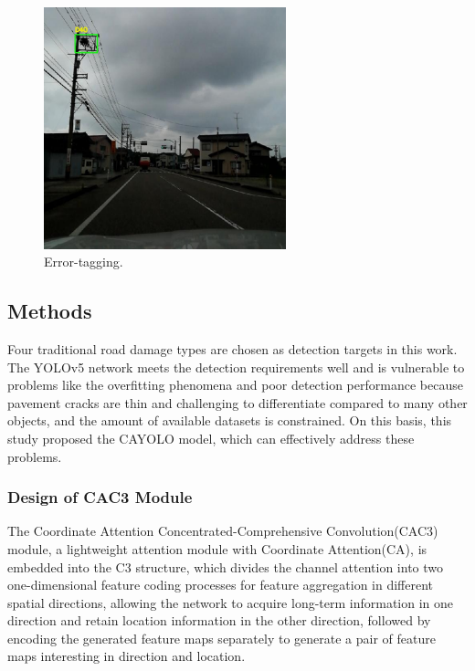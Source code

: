 \documentclass[sensors,article,submit,moreauthors]{Definitions/mdpi}
\begin{document}
    \begin{figure}[H]
        \includegraphics[width=7cm]{images/figure2}
        \caption{Error-tagging.\label{fig:2}}
    \end{figure}

    \subsection{Methods}

    Four traditional road damage types are chosen as detection targets in this work. The YOLOv5 network meets the detection requirements well and is vulnerable to problems like the overfitting phenomena and poor detection performance because pavement cracks are thin and challenging to differentiate compared to many other objects, and the amount of available datasets is constrained. On this basis, this study proposed the CAYOLO model, which can effectively address these problems.

    \subsubsection{Design of CAC3 Module}

    The Coordinate Attention Concentrated-Comprehensive Convolution(CAC3) module, a lightweight attention module with Coordinate Attention(CA)\citep{Hou_2021_CVPR}, is embedded into the C3 structure, which divides the channel attention into two one-dimensional feature coding processes for feature aggregation in different spatial directions, allowing the network to acquire long-term information in one direction and retain location information in the other direction, followed by encoding the generated feature maps separately to generate a pair of feature maps interesting in direction and location.
\end{document}
